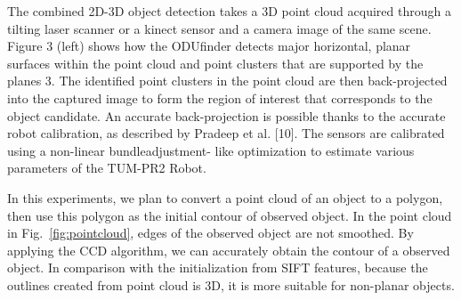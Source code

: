 The combined 2D-3D object detection takes a 3D point
cloud acquired through a tilting laser scanner or a kinect
sensor and a camera image of the same scene. Figure 3 (left)
shows how the ODUfinder detects major horizontal, planar
surfaces within the point cloud and point clusters that are
supported by the planes 3. The identified point clusters in the
point cloud are then back-projected into the captured image
to form the region of interest that corresponds to the object
candidate. An accurate back-projection is possible thanks to
the accurate robot calibration, as described by Pradeep et
al. [10]. The sensors are calibrated using a non-linear bundleadjustment-
like optimization to estimate various parameters
of the TUM-PR2 Robot.

In this experiments, we plan to convert a point cloud of an object to a
polygon, then use this polygon as the initial contour of observed
object. In the point cloud in Fig.~\ref{fig:pointcloud}, edges of
the observed object are not smoothed. By applying the CCD algorithm,
we can accurately obtain the contour of a observed object. In
comparison with the initialization from SIFT features, because the
outlines created from point cloud is 3D, it is more
suitable for non-planar objects.




